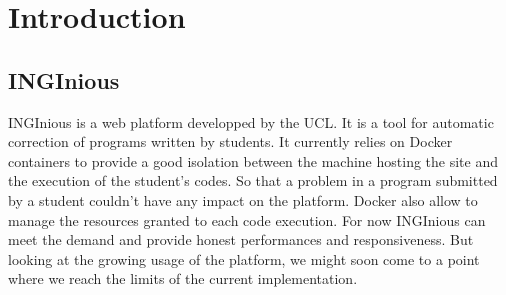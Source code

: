 \chapter{Introduction}

\section{INGInious}

INGInious is a web platform developped by the UCL.  It is a tool for automatic correction of programs written by students.  It currently relies on Docker containers to provide a good isolation between the machine hosting the site and the execution of the student's codes.  So that a problem in a program submitted by a student couldn't have any impact on the platform.  Docker also allow to manage the resources granted to each code execution.  For now INGInious can meet the demand and provide honest performances and responsiveness.  But looking at the growing usage of the platform, we might soon come to a point where we reach the limits of the current implementation.

